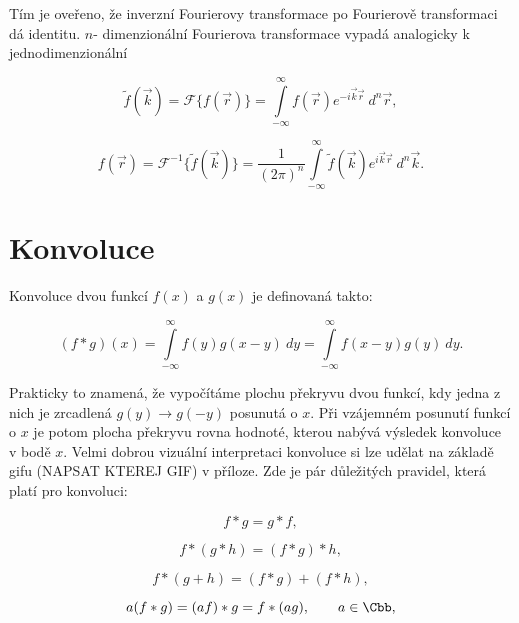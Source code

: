 Tím je oveřeno, že inverzní Fourierovy transformace po Fourierově transformaci dá identitu. $n$- dimenzionální Fourierova transformace vypadá analogicky k jednodimenzionální

\begin{equation}\label{eq:n_four_trans}
\widetilde{f}(\vec{k}) = \mathscr{F}\{f(\vec{r})\} = \int\limits_{-\infty}^{\infty} f(\vec{r}) e^{-i \vec{k}\vec{r}}~ d^n\vec{r},
\end{equation}

\begin{equation}\label{eq:n_four_trans_inv}
f(\vec{r}) = \mathscr{F}^{-1}\{\widetilde{f}(\vec{k})\} = \frac{1}{(2 \pi)^n}\int\limits_{-\infty}^{\infty} \widetilde{f}(\vec{k}) e^{i \vec {k} \vec{r}}~ d^n \vec{k}.
\end{equation}


\section{Konvoluce}

Konvoluce dvou funkcí $f(x)$ a $g(x)$ je definovaná takto:

\begin{equation}\label{eq:konvoluce}
(f \ast g)(x) = \int\limits_{-\infty}^{\infty} f(y) g(x-y)~ dy = \int\limits_{-\infty}^{\infty} f(x-y) g(y)~ dy.
\end{equation}

Prakticky to znamená, že vypočítáme plochu překryvu dvou funkcí, kdy jedna z nich je zrcadlená $g(y)\rightarrow g(-y) $ posunutá o $x$. Při vzájemném posunutí funkcí o $x$ je potom plocha překryvu rovna hodnoté, kterou nabývá výsledek konvoluce v bodě $x$. Velmi dobrou vizuální interpretaci konvoluce si lze udělat na základě gifu (NAPSAT KTEREJ GIF) v příloze. Zde je pár důležitých pravidel, která platí pro konvoluci:

\begin{equation}
f \ast g = g \ast f,
\end{equation}

\begin{equation}
f \ast (g \ast h) = (f \ast g) \ast h,
\end{equation}

\begin{equation}
f \ast(g + h) = (f \ast g) + (f \ast h),
\end{equation}

\begin{equation}
a(f \ast g) = (a f)\ast g = f \ast(ag), \qquad a \in \Cbb,
\end{equation}

